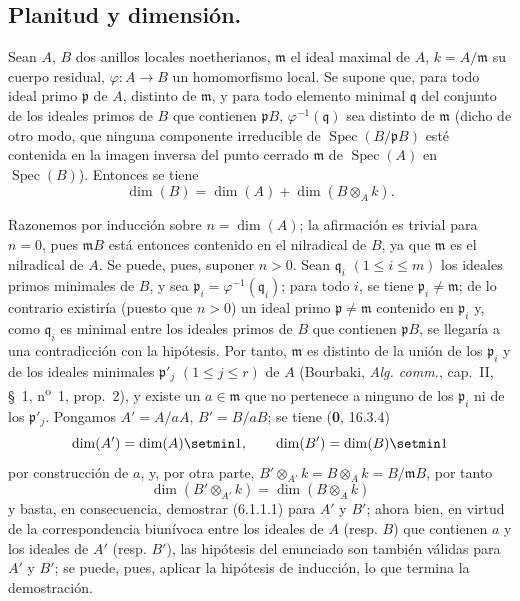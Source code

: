 \subsection{Planitud y dimensión.}

\begin{proposition}[6.1.1]
\label{IV.2.s6.1.1-fr}
Sean $A$, $B$ dos anillos locales noetherianos, $\mathfrak m$ el ideal maximal
de $A$, $k=A/\mathfrak m$ su cuerpo residual,
$\varphi:A\to B$ un homomorfismo local. Se supone que, para todo ideal
primo $\mathfrak p$ de $A$, distinto de $\mathfrak m$, y para todo elemento
minimal $\mathfrak q$ del conjunto de los ideales primos de $B$ que contienen
$\mathfrak pB$, $\varphi^{-1}(\mathfrak q)$ sea distinto de $\mathfrak m$
\textup{(dicho de otro modo, que ninguna componente irreducible de
$\operatorname{Spec}(B/\mathfrak pB)$ esté contenida en la imagen inversa
del punto cerrado $\mathfrak m$ de $\operatorname{Spec}(A)$ en
$\operatorname{Spec}(B)$)}. Entonces se tiene
\begin{equation}
\dim(B)=\dim(A)+\dim(B\otimes_A k).
\tag{6.1.1.1}\label{IV.2.s6.1.1.1-fr}
\end{equation}
\end{proposition}

Razonemos por inducción sobre $n=\dim(A)$; la afirmación es trivial para
$n=0$, pues $\mathfrak mB$ está entonces contenido en el nilradical de $B$, ya
que $\mathfrak m$ es el nilradical de $A$. Se puede, pues, suponer $n>0$. Sean
$\mathfrak q_i$ $(1\leq i\leq m)$ los ideales primos minimales de $B$, y sea
$\mathfrak p_i=\varphi^{-1}(\mathfrak q_i)$; para todo $i$, se tiene
$\mathfrak p_i\neq\mathfrak m$; de lo contrario existiría (puesto que $n>0$)
un ideal primo $\mathfrak p\neq\mathfrak m$ contenido en $\mathfrak p_i$ y,
como $\mathfrak q_i$ es minimal entre los ideales primos de $B$ que contienen
$\mathfrak pB$, se llegaría a una contradicción con la hipótesis. Por tanto,
$\mathfrak m$ es distinto de la unión de los $\mathfrak p_i$ y de los ideales
minimales $\mathfrak p'_j$ $(1\leq j\leq r)$ de $A$ (Bourbaki,
\emph{Alg. comm.}, cap.~II, §~1, n\textsuperscript{o}~1, prop.~2), y existe
un $a\in\mathfrak m$ que no pertenece a ninguno de los $\mathfrak p_i$ ni de
los $\mathfrak p'_j$. Pongamos $A'=A/aA$, $B'=B/aB$; se tiene (\textbf 0, 16.3.4)
\[
\dim(A')=\dim(A)\setmin 1,\qquad \dim(B')=\dim(B)\setmin 1
\]
por construcción de $a$, y, por otra parte,
$B'\otimes_{A'}k=B\otimes_Ak=B/\mathfrak mB$, por tanto
\[
\dim(B'\otimes_{A'}k)=\dim(B\otimes_Ak)
\]
y basta, en consecuencia, demostrar (6.1.1.1) para $A'$ y $B'$; ahora bien, en
virtud de la correspondencia biunívoca entre los ideales de $A$ (resp. $B$)
que contienen $a$ y los ideales de $A'$ (resp. $B'$), las hipótesis del
enunciado son también válidas para $A'$ y $B'$; se puede, pues, aplicar la
hipótesis de inducción, lo que termina la demostración.

